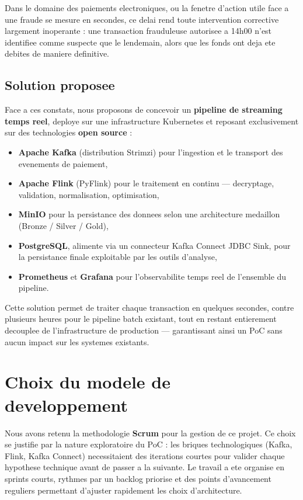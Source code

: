 Dans le domaine des paiements electroniques, ou la fenetre d'action utile face a une
fraude se mesure en secondes, ce delai rend toute intervention corrective largement
inoperante : une transaction frauduleuse autorisee a 14h00 n'est identifiee comme
suspecte que le lendemain, alors que les fonds ont deja ete debites de maniere
definitive.

\subsection{Solution proposee}

Face a ces constats, nous proposons de concevoir un \textbf{pipeline de streaming
temps reel}, deploye sur une infrastructure Kubernetes et reposant exclusivement sur
des technologies \textbf{open source} :

\begin{itemize}
    \item \textbf{Apache Kafka} (distribution Strimzi) pour l'ingestion et le transport
    des evenements de paiement,
    \item \textbf{Apache Flink} (PyFlink) pour le traitement en continu --- decryptage,
    validation, normalisation, optimisation,
    \item \textbf{MinIO} pour la persistance des donnees selon une architecture
    medaillon (Bronze / Silver / Gold),
    \item \textbf{PostgreSQL}, alimente via un connecteur Kafka Connect JDBC Sink,
    pour la persistance finale exploitable par les outils d'analyse,
    \item \textbf{Prometheus} et \textbf{Grafana} pour l'observabilite temps reel de
    l'ensemble du pipeline.
\end{itemize}

Cette solution permet de traiter chaque transaction en quelques secondes, contre
plusieurs heures pour le pipeline batch existant, tout en restant entierement
decouplee de l'infrastructure de production --- garantissant ainsi un PoC sans aucun
impact sur les systemes existants.

\section{Choix du modele de developpement}
\label{sec:scrum}

Nous avons retenu la methodologie \textbf{Scrum} pour la gestion de ce projet. Ce choix
se justifie par la nature exploratoire du PoC : les briques technologiques (Kafka,
Flink, Kafka Connect) necessitaient des iterations courtes pour valider chaque
hypothese technique avant de passer a la suivante. Le travail a ete organise en
sprints courts, rythmes par un backlog priorise et des points d'avancement reguliers
permettant d'ajuster rapidement les choix d'architecture.

